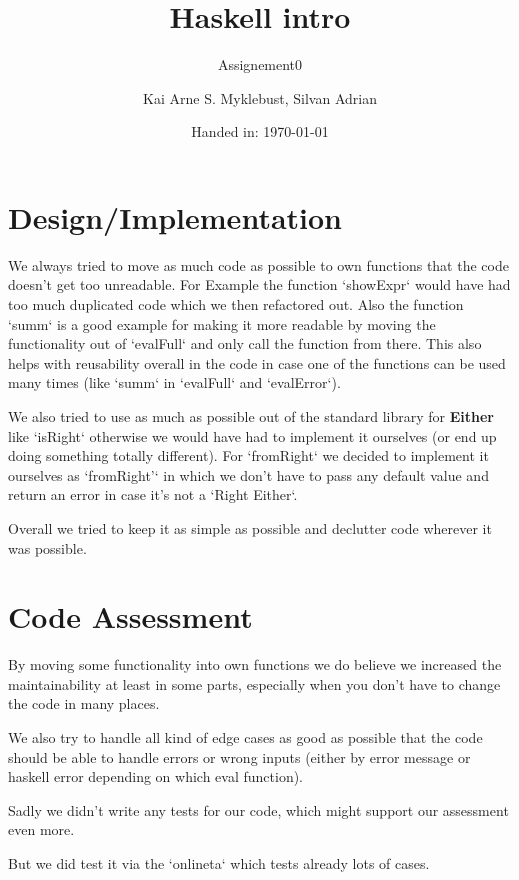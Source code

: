 \documentclass[12pt]{article}
\begin{document}
\title{Haskell intro}
\subtitle{Assignement0}

\author{Kai Arne S. Myklebust, Silvan Adrian}
\date{Handed in: \today}
	
\maketitle
\tableofcontents

\section{Design/Implementation}
We always tried to move as much code as possible to own functions that the code doesn't get too unreadable.
For Example the function `showExpr` would have had too much duplicated code which we then refactored out.
Also the function `summ` is a good example for making it more readable by moving the functionality out of `evalFull` and only call the function from there.
This also helps with reusability overall in the code in case one of the functions can be used many times (like `summ` in `evalFull` and `evalError`).

We also tried to use as much as possible out of the standard library for \textbf{Either} like `isRight` otherwise we would have had to implement it ourselves (or end up doing something totally different). For `fromRight` we decided to implement it ourselves as `fromRight'` in which we don't have to pass any default value and return an error in case it's not a `Right Either`.

Overall we tried to keep it as simple as possible and declutter code wherever it was possible.


\section{Code Assessment}

By moving some functionality into own functions we do believe we increased the maintainability at least in some parts, especially when you don't have to change the code in many places.

We also try to handle all kind of edge cases as good as possible that the code should be able to handle errors or wrong inputs (either by error message or haskell error depending on which eval function).

Sadly we didn't write any tests for our code, which might support our assessment even more.

But we did test it via the `onlineta` which tests already lots of cases.
\end{document}
